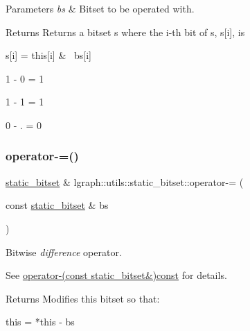 \begin{DoxyParams}{Parameters}
{\em bs} & Bitset to be operated with. \\
\hline
\end{DoxyParams}
\begin{DoxyReturn}{Returns}
Returns a bitset s where the i-\/th bit of s, s\mbox{[}i\mbox{]}, is \begin{DoxyVerb}s[i] = this[i] & ~bs[i]
\end{DoxyVerb}

\begin{DoxyItemize}
\item 1 -\/ 0 = 1
\item 1 -\/ 1 = 1
\item 0 -\/ . = 0 
\end{DoxyItemize}
\end{DoxyReturn}
\mbox{\label{classlgraph_1_1utils_1_1static__bitset_af4f4a29642e50b6efa406d5f772a0e69}} 
\subsubsection{\texorpdfstring{operator-\/=()}{operator-=()}}
{\footnotesize\ttfamily \hyperlink{classlgraph_1_1utils_1_1static__bitset}{static\+\_\+bitset} \& lgraph\+::utils\+::static\+\_\+bitset\+::operator-\/= (\begin{DoxyParamCaption}\item[{const \hyperlink{classlgraph_1_1utils_1_1static__bitset}{static\+\_\+bitset} \&}]{bs }\end{DoxyParamCaption})}



Bitwise {\itshape difference} operator. 

See \hyperlink{classlgraph_1_1utils_1_1static__bitset_ab7ab47c906e9e08a61a48bb935594e90}{operator-\/(const static\+\_\+bitset\&)const} for details. \begin{DoxyReturn}{Returns}
Modifies this bitset so that\+: \begin{DoxyVerb}this = *this - bs\end{DoxyVerb}
 
\end{DoxyReturn}
\mbox{\label{classlgraph_1_1utils_1_1static__bitset_a633df0acba7afd646bbbef1acd85ca49}} 

